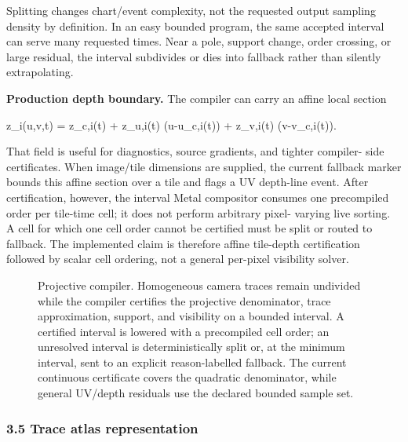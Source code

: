 \documentclass[
]{article}
\makeatletter
\newenvironment{Shaded}{}{}
\newcommand{\NormalTok}[1]{#1}
\newcommand*\pandocbounded[1]{%
  \sbox\pandoc@box{#1}%
  \Gscale@div\@tempa{\textheight}{\dimexpr\ht\pandoc@box+\dp\pandoc@box\relax}%
  \Gscale@div\@tempb{\linewidth}{\wd\pandoc@box}%
  \ifdim\@tempb\p@<\@tempa\p@\let\@tempa\@tempb\fi%
  \ifdim\@tempa\p@<\p@\scalebox{\@tempa}{\usebox\pandoc@box}%
  \else\usebox{\pandoc@box}%
  \fi%
}
\makeatother
\begin{document}
Splitting changes chart/event complexity, not the requested output
sampling density by definition. In an easy bounded program, the same
accepted interval can serve many requested times. Near a pole, support
change, order crossing, or large residual, the interval subdivides or
dies into fallback rather than silently extrapolating.

\textbf{Production depth boundary.} The compiler can carry an affine
local section

\begin{Shaded}
\begin{Highlighting}[]
\NormalTok{z\_i(u,v,t) = z\_c,i(t)}
\NormalTok{           + z\_u,i(t) (u{-}u\_c,i(t))}
\NormalTok{           + z\_v,i(t) (v{-}v\_c,i(t)).}
\end{Highlighting}
\end{Shaded}

That field is useful for diagnostics, source gradients, and tighter
compiler- side certificates. When image/tile dimensions are supplied,
the current fallback marker bounds this affine section over a tile and
flags a UV depth-line event. After certification, however, the interval
Metal compositor consumes one precompiled order per tile-time cell; it
does not perform arbitrary pixel- varying live sorting. A cell for which
one cell order cannot be certified must be split or routed to fallback.
The implemented claim is therefore affine tile-depth certification
followed by scalar cell ordering, not a general per-pixel visibility
solver.

\begin{figure}
\centering
\pandocbounded{}
\caption{Projective compiler. Homogeneous camera traces remain undivided
while the compiler certifies the projective denominator, trace
approximation, support, and visibility on a bounded interval. A
certified interval is lowered with a precompiled cell order; an
unresolved interval is deterministically split or, at the minimum
interval, sent to an explicit reason-labelled fallback. The current
continuous certificate covers the quadratic denominator, while general
UV/depth residuals use the declared bounded sample set.}
\end{figure}

\subsubsection{3.5 Trace atlas
representation}\label{trace-atlas-representation}
\end{document}
